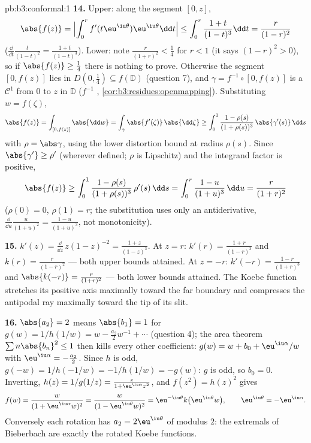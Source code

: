 \begin{solution}{pb:b3:conformal:1}
\textbf{14.} Upper: along the segment $[0, z]$,
\[
\abs{f(z)} = \Bigl|\int_0^rf'(t\eu^{\iu\theta})
\eu^{\iu\theta}\dd t\Bigr|
\leq \int_0^r\frac{1+t}{(1-t)^3}\dd t
= \frac{r}{(1-r)^2}
\]
($\frac{\dd}{\dd t}\frac t{(1-t)^2} = \frac{1+t}{(1-t)^3}$).
Lower: note $\frac r{(1+r)^2} < \frac14$ for $r < 1$ (it
says $(1-r)^2 > 0$), so if $\abs{f(z)} \geq \frac14$ there
is nothing to prove. Otherwise the segment $[0, f(z)]$ lies
in $D(0, \frac14) \subseteq f(\mathbb D)$ (question 7), and
$\gamma = f^{-1}\circ[0, f(z)]$ is a $\mathcal C^1$ 
from $0$ to $z$ in $\mathbb D$ ($f^{-1}$ ,
\cref{cor:b3:residues:openmapping}). Substituting $w =
f(\zeta)$,
\[
\abs{f(z)} = \int_{[0,f(z)]}\abs{\dd w}
= \int_\gamma\abs{f'(\zeta)}\,\abs{\dd\zeta}
\geq \int_0^1\frac{1 - \rho(s)}{(1 + \rho(s))^3}
\,\abs{\gamma'(s)}\,\dd s
\]
with $\rho = \abs\gamma$, using the lower distortion bound
at radius $\rho(s)$. Since $\abs{\gamma'} \geq \rho'$
(wherever defined; $\rho$ is Lipschitz) and the integrand
factor is positive,
\[
\abs{f(z)} \geq \int_0^1
\frac{1 - \rho(s)}{(1 + \rho(s))^3}\,\rho'(s)\,\dd s
= \int_0^{r}\frac{1 - u}{(1 + u)^3}\,\dd u
= \frac{r}{(1 + r)^2}
\]
($\rho(0) = 0$, $\rho(1) = r$; the substitution uses only an
antiderivative, $\frac{\dd}{\dd u}\frac u{(1+u)^2} =
\frac{1-u}{(1+u)^3}$, not monotonicity).

\textbf{15.} $k'(z) = \frac{\dd}{\dd z}\,z(1 - z)^{-2} =
\frac{1 + z}{(1 - z)^3}$. At $z = r$: $k'(r) =
\frac{1+r}{(1-r)^3}$ and $k(r) = \frac r{(1-r)^2}$ --- both
upper bounds attained. At $z = -r$: $k'(-r) =
\frac{1-r}{(1+r)^3}$ and $\abs{k(-r)} = \frac r{(1+r)^2}$
--- both lower bounds attained. The Koebe function stretches
its positive axis maximally toward the far boundary and
compresses the antipodal ray maximally toward the tip of its
slit.

\textbf{16.} $\abs{a_2} = 2$ means $\abs{b_1} = 1$ for $g(w)
= 1/h(1/w) = w - \frac{a_2}2w^{-1} + \cdots$ (question 4);
the area theorem $\sum n\abs{b_n}^2 \leq 1$ then kills every
other coefficient: $g(w) = w + b_0 + \eu^{\iu\alpha}/w$ with
$\eu^{\iu\alpha} = -\frac{a_2}2$. Since $h$ is odd, $g(-w) =
1/h(-1/w) = -1/h(1/w) = -g(w)$: $g$ is odd, so $b_0 = 0$.
Inverting, $h(z) = 1/g(1/z) = \frac{z}{1 +
\eu^{\iu\alpha}z^2}$, and $f(z^2) = h(z)^2$ gives
\[
f(w) = \frac{w}{(1 + \eu^{\iu\alpha}w)^2}
= \frac{w}{(1 - \eu^{\iu\theta}w)^2}
= \eu^{-\iu\theta}k\bigl(\eu^{\iu\theta}w\bigr),
\qquad \eu^{\iu\theta} = -\eu^{\iu\alpha} .
\]
Conversely each rotation has $a_2 = 2\eu^{\iu\theta}$ of
modulus $2$: the extremals of Bieberbach are exactly the
rotated Koebe functions.


\end{solution}

